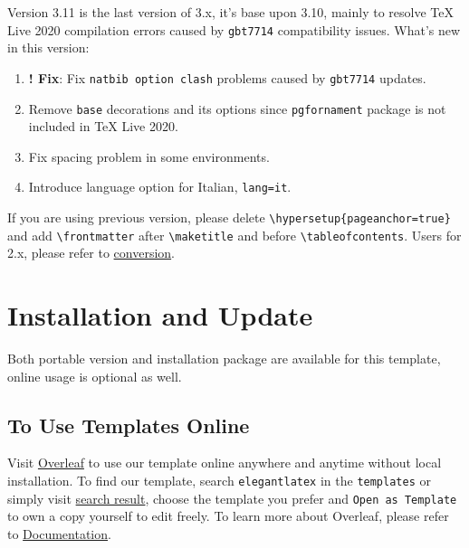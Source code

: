 \documentclass[11pt,fancy,authoryear]{elegantbook}
\begin{document}
Version 3.11 is the last version of 3.x, it's base upon 3.10, mainly to resolve \TeX{} Live 2020 compilation errors caused by \lstinline{gbt7714} compatibility issues. What\rq s new in this version:

\begin{enumerate}
  \item \textbf{! Fix}: Fix \lstinline{natbib option clash} problems caused by \lstinline{gbt7714} updates.
  \item Remove \lstinline{base} decorations and its options since \lstinline{pgfornament} package is not included in \TeX{} Live 2020.
  \item Fix spacing problem in some environments.
  \item Introduce language option for Italian, \lstinline{lang=it}.
\end{enumerate}


\begin{note}
  If you are using previous version, please delete \lstinline|\hypersetup{pageanchor=true}| and add \lstinline{\frontmatter} after \lstinline{\maketitle} and before \lstinline{\tableofcontents}. Users for 2.x, please refer to \href{https://github.com/ElegantLaTeX/ElegantBook/wiki/convert}{conversion}.
\end{note}

\section{Installation and Update}
Both portable version and installation package are available for this template, online usage is optional as well.

\subsection{To Use Templates Online}
Visit \href{https://www.overleaf.com/}{Overleaf} to use our template online anywhere and anytime without local installation. To find our template, search \lstinline{elegantlatex} in the \lstinline{templates} or simply visit \href{https://www.overleaf.com/latex/templates?addsearch=elegantlatex}{search result}, choose the template you prefer and \lstinline{Open as Template} to own a copy yourself to edit freely. To learn more about Overleaf, please refer to \href{https://www.overleaf.com/learn}{Documentation}.
\end{document}
